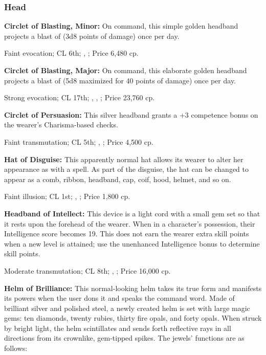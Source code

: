\subsubsection{Head}

\textbf{Circlet of Blasting, Minor:} On command, this simple golden headband projects a blast of  (3d8 points of damage) once per day.

Faint evocation; CL 6th; , ; Price 6,480 cp.


\textbf{Circlet of Blasting, Major:} On command, this elaborate golden headband projects a blast of  (5d8 maximized for 40 points of damage) once per day.

Strong evocation; CL 17th; , , ; Price 23,760 cp.


\textbf{Circlet of Persuasion:} This silver headband grants a +3 competence bonus on the wearer's Charisma-based checks.

Faint transmutation; CL 5th; , ; Price 4,500 cp.


\textbf{Hat of Disguise:} This apparently normal hat allows its wearer to alter her appearance as with a  spell. As part of the disguise, the hat can be changed to appear as a comb, ribbon, headband, cap, coif, hood, helmet, and so on.

Faint illusion; CL 1st; , ; Price 1,800 cp.


\textbf{Headband of Intellect:} This device is a light cord with a small gem set so that it rests upon the forehead of the wearer. When in a character's possession, their Intelligence score becomes 19. This does not earn the wearer extra skill points when a new level is attained; use the unenhanced Intelligence bonus to determine skill points.

Moderate transmutation; CL 8th; , ; Price 16,000 cp.


\textbf{Helm of Brilliance:} This normal-looking helm takes its true form and manifests its powers when the user dons it and speaks the command word. Made of brilliant silver and polished steel, a newly created helm is set with large magic gems: ten diamonds, twenty rubies, thirty fire opals, and forty opals. When struck by bright light, the helm scintillates and sends forth reflective rays in all directions from its crownlike, gem-tipped spikes. The jewels' functions are as follows:

